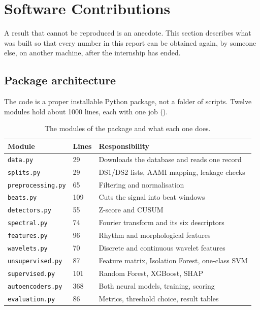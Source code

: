 \documentclass[a4paper, 12pt]{article}
\begin{document}
\section{Software Contributions} \label{sec:software}

A result that cannot be reproduced is an anecdote. This section describes what was
built so that every number in this report can be obtained again, by someone else,
on another machine, after the internship has ended.

\subsection{Package architecture} \label{subsec:architecture}

The code is a proper installable Python package, not a folder of scripts. Twelve
modules hold about \num{1000} lines, each with one job
().

\begin{table}[htbp]
  \centering
  \small
  \caption{The modules of the package and what each one does.}
  \label{tab:modules}
  \begin{tabular}{@{}llp{}@{}}
    \toprule
    \textbf{Module} & \textbf{Lines} & \textbf{Responsibility} \\
    \midrule
    \texttt{data.py}          & 29  & Downloads the database and reads one record \\
    \texttt{splits.py}        & 29  & DS1/DS2 lists, AAMI mapping, leakage checks \\
    \texttt{preprocessing.py} & 65  & Filtering and normalisation \\
    \texttt{beats.py}         & 109 & Cuts the signal into beat windows \\
    \texttt{detectors.py}     & 55  & Z-score and CUSUM \\
    \texttt{spectral.py}      & 74  & Fourier transform and its six descriptors \\
    \texttt{features.py}      & 96  & Rhythm and morphological features \\
    \texttt{wavelets.py}      & 70  & Discrete and continuous wavelet features \\
    \texttt{unsupervised.py}  & 87  & Feature matrix, Isolation Forest, one-class SVM \\
    \texttt{supervised.py}    & 101 & Random Forest, XGBoost, SHAP \\
    \texttt{autoencoders.py}  & 368 & Both neural models, training, scoring \\
    \texttt{evaluation.py}    & 86  & Metrics, threshold choice, result tables \\
    \bottomrule
  \end{tabular}
\end{table}
\end{document}
